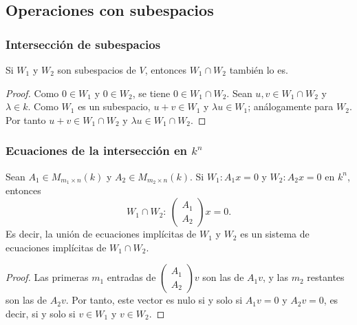 \subsection{Operaciones con subespacios}

\begin{frame}[allowframebreaks, t]
    \frametitle{Intersección de subespacios}

    \begin{proposition}
        Si $W_1$ y $W_2$ son subespacios de $V$, entonces
        $W_1\cap W_2$ también lo es.
    \end{proposition}

    \begin{proof}
        Como $0\in W_1$ y $0\in W_2$, se tiene $0\in W_1\cap W_2$.
        Sean $u,v\in W_1\cap W_2$ y $\lambda\in k$.
        Como $W_1$ es un subespacio, $u+v\in W_1$ y $\lambda u\in W_1$;
        análogamente para $W_2$.
        Por tanto $u+v\in W_1\cap W_2$ y $\lambda u\in W_1\cap W_2$.
    \end{proof}
\end{frame}


\begin{frame}
    \frametitle{Ecuaciones de la intersección en $k^n$}

    \begin{proposition}
        Sean $A_1\in M_{m_1\times n}(k)$ y $A_2\in M_{m_2\times n}(k)$. Si
        $W_1\colon A_1x=0$ y $W_2\colon A_2x=0$ en $k^n$,
        entonces
        \[
            W_1\cap W_2\colon\
            \begin{pmatrix}A_1\\ \hline A_2\end{pmatrix}x=0.
        \]
        Es decir, la unión de ecuaciones implícitas de $W_1$ y $W_2$
        es un sistema de ecuaciones implícitas de $W_1\cap W_2$.
    \end{proposition}

    \begin{proof}
        Las primeras $m_1$ entradas de
        $\left(\begin{smallmatrix}A_1\\ \hline A_2\end{smallmatrix}\right)v$ son las de $A_1v$, y las
        $m_2$ restantes son las de $A_2v$. Por tanto, este vector es nulo
        si y solo si $A_1v=0$ y $A_2v=0$, es decir, si y solo si
        $v\in W_1$ y $v\in W_2$.
    \end{proof}
\end{frame}


